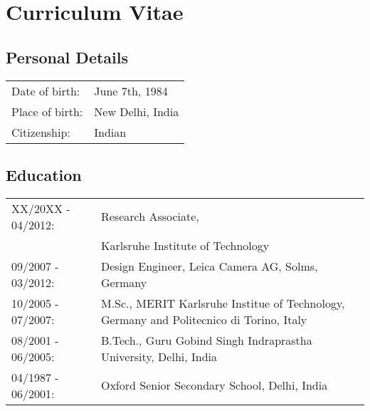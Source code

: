 \chapter*{Curriculum Vitae}

\section*{Personal Details}
\begin{tabular}[]{ll}
	Date of birth: & June 7th, 1984 \\
	Place of birth: & New Delhi, India \\
	Citizenship: & Indian
\end{tabular}

\section*{Education}

\begin{tabular}[]{lp{6.95cm}}
	
	XX/20XX - 04/2012: & Research Associate, \\
										 & Karlsruhe Institute of Technology \\
	09/2007 - 03/2012: & Design Engineer, Leica Camera AG, Solms, Germany \\
	10/2005 - 07/2007: & M.Sc., MERIT Karlsruhe Institue of Technology, Germany and Politecnico di Torino, Italy \\
	08/2001 - 06/2005: & B.Tech., Guru Gobind Singh Indraprastha University, Delhi, India \\
	04/1987 - 06/2001: & Oxford Senior Secondary School, Delhi, India 	
\end{tabular}

